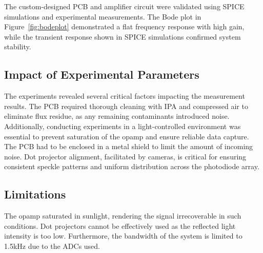 The custom-designed PCB and amplifier circuit were validated using SPICE simulations and experimental measurements. 
The Bode plot in Figure~\ref{fig:bodeplot} demonstrated a flat frequency response with high gain, while 
the transient response shown in SPICE simulations confirmed system stability. 

\subsection{Impact of Experimental Parameters}

The experiments revealed several critical factors impacting the measurement results. 
The PCB required thorough cleaning with IPA and compressed air to eliminate flux residue, as any remaining contaminants introduced noise. 
Additionally, conducting experiments in a light-controlled environment was essential to prevent 
saturation of the opamp and ensure reliable data capture. 
The PCB had to be enclosed in a metal shield to limit the amount of incoming noise.
Dot projector alignment, facilitated by cameras, is critical for ensuring consistent speckle patterns and 
uniform distribution across the photodiode array.

\subsection{Limitations}
The opamp saturated in sunlight, rendering the signal irrecoverable in such conditions. Dot projectors cannot be 
effectively used as the reflected light intensity is too low.
Furthermore, the bandwidth of the system is limited to 1.5kHz due to the ADCs used.
